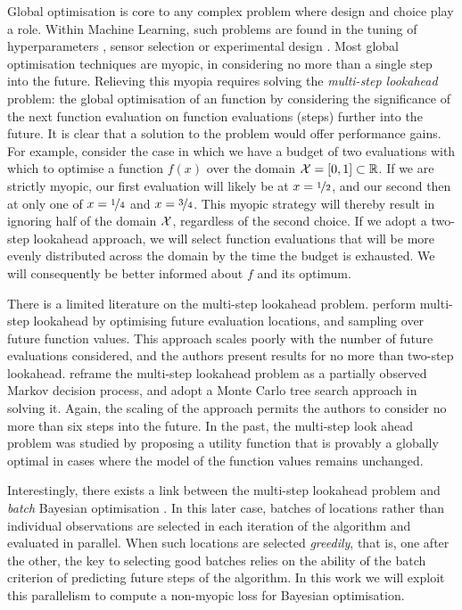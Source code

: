 \documentclass[twoside]{article}
\newcommand{\reals}{\mathbb{R}}
\begin{document}
Global optimisation is core to any complex problem where design and choice play a role. 
Within Machine Learning, such problems are found in the tuning of hyperparameters \citep{Snoek*Larochelle*Adams_2012}, sensor selection \citep{Garnett*Osborne*Roberts_2010} or experimental design \citep{gonzalez2014, martinez-cantin_bayesian_2009}. 
Most global optimisation techniques are myopic, in considering no more than a single step into the future. 
Relieving this myopia requires solving the \emph{multi-step lookahead} problem: the global optimisation of an function by considering the significance of the next function evaluation on function evaluations (steps) further into the future. 
It is clear that a solution to the problem would offer performance gains.
For example, consider the case in which we have a budget of two evaluations with which to optimise a function $f(x)$ over the domain $\inputSpace = [0, 1] \subset \reals$. 
If we are strictly myopic, our first evaluation will likely be at 
$x=\nicefrac{1}{2}$, and our second then at only one of $x=\nicefrac{1}{4}$ and $x=\nicefrac{3}{4}$. 
This myopic strategy will thereby result in ignoring half of the domain $\mathcal{X}$, regardless of the second choice. 
If we adopt a two-step lookahead approach, we will select function evaluations that will be more evenly distributed across the domain by the time the budget is exhausted. 
We will consequently be better informed about $f$ and its optimum.

There is a limited literature on the multi-step lookahead problem.
\cite{osborne_gaussian_2009} perform multi-step lookahead by optimising future evaluation locations, and sampling over future function values. 
This approach scales poorly with the number of future evaluations considered, and the authors present results for no more than two-step lookahead.
\citep{Marchant*Ramos*Sanner*2014} reframe the multi-step lookahead problem as a partially observed Markov decision process, and adopt a Monte Carlo tree search approach in solving it. 
Again, the scaling of the approach permits the authors to consider no more than six steps into the future. In the past, the multi-step look ahead problem was studied by \cite{StreltsovVakili1999} proposing a utility function that is provably a globally optimal in cases where the model of the function values remains unchanged.

Interestingly, there exists a link between the multi-step lookahead problem and \emph{batch} Bayesian optimisation \citep{Ginsbourger2009,Azimi2011,Azimi2012}. In this later case, batches of locations rather than individual observations are selected in each iteration of the algorithm and evaluated in parallel. When such locations are selected \emph{greedily}, that is, one after the other, the key to selecting good batches relies on the ability of the batch criterion of predicting future steps of the algorithm. In this work we will exploit this parallelism to compute a non-myopic loss for Bayesian optimisation. 
\end{document}
